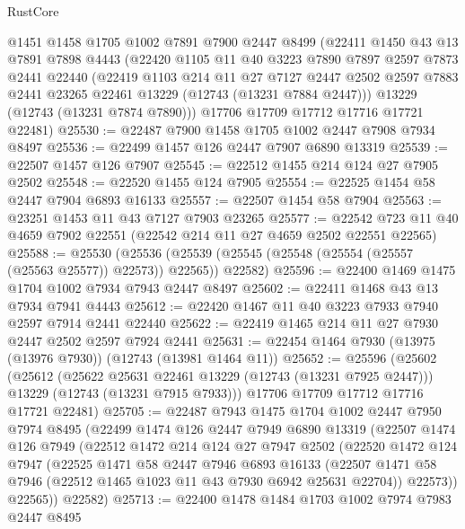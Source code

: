 \begin{lexlean}{RustCore}
\begin{coremodule}
    @1451
    @1458
    @1705
    @1002
    @7891
    @7900
    @2447
    @8499
    (@22411
      @1450
      @43
      @13
      @7891
      @7898
      @4443
      (@22420
        @1105
        @11
        @40
        @3223
        @7890
        @7897
        @2597
        @7873
        @2441
        @22440
        (@22419
          @1103
          @214
          @11
          @27
          @7127
          @2447
          @2502
          @2597
          @7883
          @2441
          @23265
          @22461
          @13229
          (@12743 (@13231 @7884 @2447)))
        @13229
        (@12743 (@13231 @7874 @7890)))
      @17706
      @17709
      @17712
      @17716
      @17721
      @22481)
@25530 := @22487 @7900 @1458 @1705 @1002 @2447 @7908 @7934 @8497
@25536 := @22499 @1457 @126 @2447 @7907 @6890 @13319
@25539 := @22507 @1457 @126 @7907
@25545 := @22512 @1455 @214 @124 @27 @7905 @2502
@25548 := @22520 @1455 @124 @7905
@25554 := @22525 @1454 @58 @2447 @7904 @6893 @16133
@25557 := @22507 @1454 @58 @7904
@25563 := @23251 @1453 @11 @43 @7127 @7903 @23265
@25577 := @22542 @723 @11 @40 @4659 @7902 @22551 (@22542 @214 @11 @27 @4659 @2502 @22551 @22565)
@25588 := @25530
    (@25536 (@25539 (@25545 (@25548 (@25554 (@25557 (@25563 @25577)) @22573)) @22565)) @22582)
@25596 := @22400 @1469 @1475 @1704 @1002 @7934 @7943 @2447 @8497
@25602 := @22411 @1468 @43 @13 @7934 @7941 @4443
@25612 := @22420 @1467 @11 @40 @3223 @7933 @7940 @2597 @7914 @2441 @22440
@25622 := @22419 @1465 @214 @11 @27 @7930 @2447 @2502 @2597 @7924 @2441
@25631 := @22454 @1464 @7930 (@13975 (@13976 @7930)) (@12743 (@13981 @1464 @11))
@25652 := @25596
    (@25602
      (@25612
        (@25622 @25631 @22461 @13229 (@12743 (@13231 @7925 @2447)))
        @13229
        (@12743 (@13231 @7915 @7933)))
      @17706
      @17709
      @17712
      @17716
      @17721
      @22481)
@25705 := @22487
    @7943
    @1475
    @1704
    @1002
    @2447
    @7950
    @7974
    @8495
    (@22499
      @1474
      @126
      @2447
      @7949
      @6890
      @13319
      (@22507
        @1474
        @126
        @7949
        (@22512
          @1472
          @214
          @124
          @27
          @7947
          @2502
          (@22520
            @1472
            @124
            @7947
            (@22525
              @1471
              @58
              @2447
              @7946
              @6893
              @16133
              (@22507 @1471 @58 @7946 (@22512 @1465 @1023 @11 @43 @7930 @6942 @25631 @22704))
              @22573))
          @22565))
      @22582)
@25713 := @22400 @1478 @1484 @1703 @1002 @7974 @7983 @2447 @8495

\end{coremodule}
\end{lexlean}
